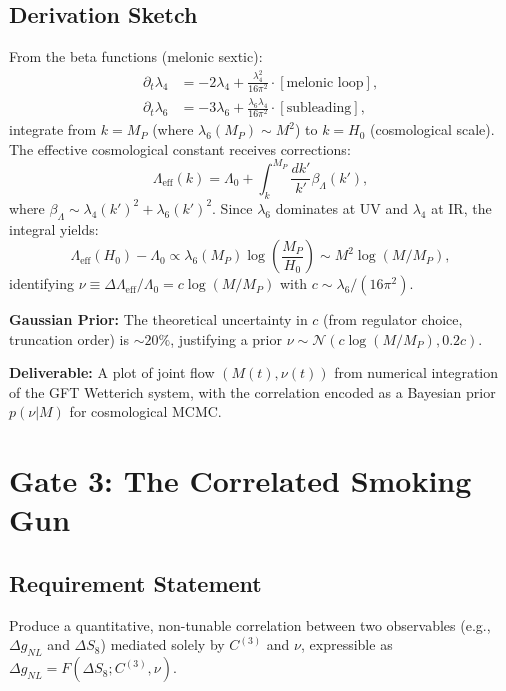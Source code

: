 \documentclass[12pt,a4paper]{article}
\begin{document}
\subsection{Derivation Sketch}

From the beta functions (melonic sextic):
\begin{align}
\partial_t \lambda_4 &= -2\lambda_4 + \frac{\lambda_4^2}{16\pi^2} \cdot [\text{melonic loop}], \\
\partial_t \lambda_6 &= -3\lambda_6 + \frac{\lambda_6 \lambda_4}{16\pi^2} \cdot [\text{subleading}],
\end{align}
integrate from \(k = M_P\) (where \(\lambda_6(M_P) \sim M^2\)) to \(k = H_0\) (cosmological scale). The effective cosmological constant receives corrections:
\begin{equation}
\Lambda_{\text{eff}}(k) = \Lambda_0 + \int_{k}^{M_P} \frac{dk'}{k'} \beta_\Lambda(k'),
\end{equation}
where \(\beta_\Lambda \sim \lambda_4(k')^2 + \lambda_6(k')^2\). Since \(\lambda_6\) dominates at UV and \(\lambda_4\) at IR, the integral yields:
\begin{equation}
\Lambda_{\text{eff}}(H_0) - \Lambda_0 \propto \lambda_6(M_P) \log\left(\frac{M_P}{H_0}\right) \sim M^2 \log(M/M_P),
\end{equation}
identifying \(\nu \equiv \Delta\Lambda_{\text{eff}}/\Lambda_0 = c\log(M/M_P)\) with \(c \sim \lambda_6/(16\pi^2)\).

\textbf{Gaussian Prior:} The theoretical uncertainty in \(c\) (from regulator choice, truncation order) is \(\sim 20\%\), justifying a prior \(\nu \sim \mathcal{N}(c\log(M/M_P), 0.2c)\).

\textbf{Deliverable:} A plot of joint flow \((M(t), \nu(t))\) from numerical integration of the GFT Wetterich system, with the correlation encoded as a Bayesian prior \(p(\nu|M)\) for cosmological MCMC.

\section{Gate 3: The Correlated Smoking Gun}

\subsection{Requirement Statement}

Produce a quantitative, non-tunable correlation between two observables (e.g., \(\Delta g_{NL}\) and \(\Delta S_8\)) mediated solely by \(C^{(3)}\) and \(\nu\), expressible as \(\Delta g_{NL} = F(\Delta S_8; C^{(3)}, \nu)\).
\end{document}
